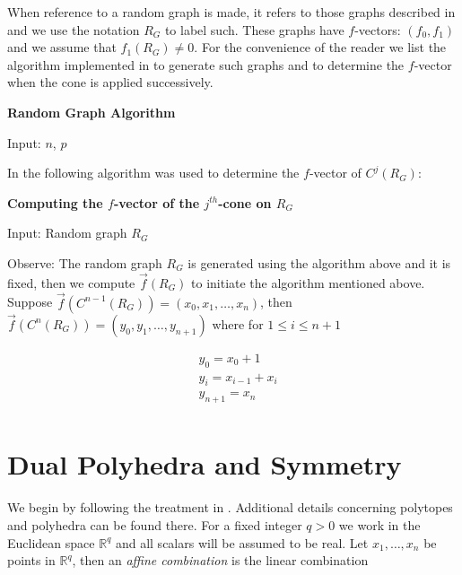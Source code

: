 \documentclass[oneside,12pt]{amsart}
\theoremstyle{definition}
\numberwithin{equation}{section}
\begin{document}
When reference to a random graph is made, it refers to those graphs described in \cite{ER} and we use the notation $R_G$ to label such.  These graphs have $f$-vectors:  $(f_0, f_1)$ and we assume that $f_1(R_G) \neq 0$.  For the convenience of the reader we list the algorithm implemented in \cite{ALDH} to generate such graphs and to determine the $f$-vector when the cone is applied successively.\\[.5ex]

\begin{center}
\textbf{Random Graph Algorithm}
\end{center}
\begin{algorithmic}
\State Input:  $n$, $p$
 
 \EndFor
{}  \Else {} \EndIf
{}
\end{algorithmic}

In \cite{ALDH} the following algorithm was used to determine the $f$-vector of $C^j(R_G)$:\\[.5ex]

\begin{center}
\textbf{Computing the $f$-vector of the $j^{th}$-cone on $R_G$}
\end{center}


\begin{algorithmic}
\State Input:  Random graph $R_G$
 \EndFor
\end{algorithmic}

Observe:  The random graph $R_G$ is generated using the algorithm above and it is fixed, then we compute $\overrightarrow{f}(R_G)$ to initiate the algorithm mentioned above.  Suppose $\overrightarrow{f}(C^{n-1}(R_G)) = (x_0,x_1,\ldots,x_n)$, then $\overrightarrow{f}(C^{n}(R_G)) = (y_0,y_1,\ldots,y_{n+1})$ where for  $ 1\leq i \leq n+1$

\begin{align*}
&y_0     = x_0 + 1  \\
& y_i    = x_{i-1} + x_i  \\
&y_{n+1} = x_n \\
\end{align*}

\section{Dual Polyhedra and Symmetry}
We begin by following the treatment in \cite{B}.  Additional details concerning polytopes and polyhedra can be found there.  For a fixed integer $q >0$ we work in the Euclidean space $\mathbb{R}^q$  and all scalars will be assumed to be real.  Let $x_1,\ldots,x_n$ be points in $\mathbb{R}^q$, then an \textit{affine combination} is the linear combination
\end{document}
